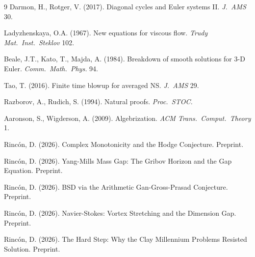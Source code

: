 \documentclass[12pt]{article}
\theoremstyle{remark}
\begin{document}
\begin{thebibliography}{9}
Darmon, H., Rotger, V. (2017).
Diagonal cycles and Euler systems II. \textit{J.\ AMS} 30.

Ladyzhenskaya, O.A. (1967).
New equations for viscous flow. \textit{Trudy Mat.\ Inst.\ Steklov} 102.

Beale, J.T., Kato, T., Majda, A. (1984).
Breakdown of smooth solutions for 3-D Euler. \textit{Comm.\ Math.\ Phys.} 94.

Tao, T. (2016).
Finite time blowup for averaged NS. \textit{J.\ AMS} 29.

Razborov, A., Rudich, S. (1994).
Natural proofs. \textit{Proc.\ STOC.}

Aaronson, S., Wigderson, A. (2009).
Algebrization. \textit{ACM Trans.\ Comput.\ Theory} 1.

Rinc\'on, D. (2026).
Complex Monotonicity and the Hodge Conjecture. Preprint.

Rinc\'on, D. (2026).
Yang-Mills Mass Gap: The Gribov Horizon and the Gap Equation. Preprint.

Rinc\'on, D. (2026).
BSD via the Arithmetic Gan-Gross-Prasad Conjecture. Preprint.

Rinc\'on, D. (2026).
Navier-Stokes: Vortex Stretching and the Dimension Gap. Preprint.

Rinc\'on, D. (2026).
The Hard Step: Why the Clay Millennium Problems Resisted Solution. Preprint.

\end{thebibliography}
\end{document}
